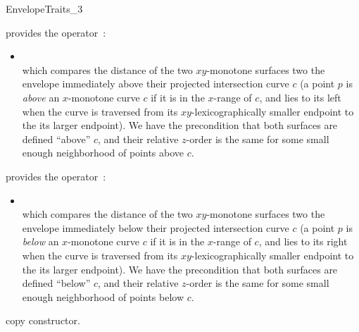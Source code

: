 \begin{ccRefConcept}{EnvelopeTraits_3}
{provides the operator~:
 \begin{itemize}
 \item {}\\
 which compares the distance of the two $xy$-monotone surfaces two
 the envelope immediately above their projected intersection curve
 $c$ (a point $p$ is {\em above} an $x$-monotone curve $c$ if it is in
 the $x$-range of $c$, and lies to its left when the curve is
 traversed from its $xy$-lexicographically smaller endpoint to the
 its larger endpoint). We have the precondition that both surfaces are
 defined ``above'' $c$, and their relative $z$-order is the same for
 some small enough neighborhood of points above $c$.
 \end{itemize}}

{provides the operator~:
 \begin{itemize}
 \item {}\\
 which compares the distance of the two $xy$-monotone surfaces two
 the envelope immediately below their projected intersection curve
 $c$ (a point $p$ is {\em below} an $x$-monotone curve $c$ if it is in
 the $x$-range of $c$, and lies to its right when the curve is
 traversed from its $xy$-lexicographically smaller endpoint to the
 its larger endpoint). We have the precondition that both surfaces are
 defined ``below'' $c$, and their relative $z$-order is the same for
 some small enough neighborhood of points below $c$.
 \end{itemize}}


\ccCreation
{}

\ccThreeToTwo

\ccGlue
{}
{copy constructor.}
\ccGlue
{}


\end{ccRefConcept}
